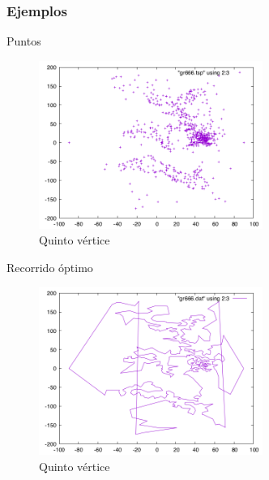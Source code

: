 \subsubsection{Ejemplos}
\begin{frame}
	\begin{exampleblock}{Puntos}
	\begin{figure}[htbH]
		\centering
		\includegraphics[width=0.65\textwidth]{../Viajante/Imagenes/gr666.png}
		\caption{Quinto vértice}
	\end{figure}
	\end{exampleblock}
\end{frame}
	
\begin{frame}
	\begin{exampleblock}{Recorrido óptimo}
	\begin{figure}[htbH]
		\centering
		\includegraphics[width=0.65\textwidth]{../Viajante/Imagenes/gr666_opt.png}
		\caption{Quinto vértice}
	\end{figure}
	\end{exampleblock}
\end{frame}